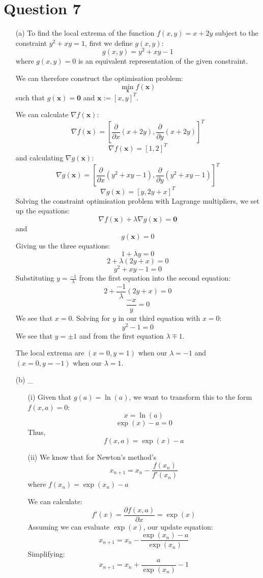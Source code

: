 \documentclass[12pt]{article}
\begin{document}
\section*{Question 7}
\begin{enumerate}
\item[(a)] To find the local extrema of the function $f(x,y) = x + 2y$ subject to the constraint $y^2 + xy = 1$, first we define $g(x, y)$:
$$g(x, y) = y^2 + xy - 1$$
where $g(x, y)=0$ is an equivalent representation of the given constraint.

We can therefore construct the optimisation problem:
$$\min_{\textbf{x}} f(\textbf{x})$$
such that $g(\textbf{x})=\textbf{0}$ and $\textbf{x} := [x, y]^T$.

We can calculate $\nabla f(\textbf{x})$:
$$\nabla f(\textbf{x}) = [\frac{\partial}{\partial x} (x+2y), \frac{\partial}{\partial y} (x+2y)]^T$$
$$\nabla f(\textbf{x}) = [1, 2]^T$$
and calculating $\nabla g(\textbf{x})$:
$$\nabla g(\textbf{x}) = [\frac{\partial}{\partial x} (y^2 + xy - 1), \frac{\partial}{\partial y} (y^2 + xy - 1)]^T$$
$$\nabla g(\textbf{x}) = [y, 2y+x]^T$$
Solving the constraint optimisation problem with Lagrange multipliers, we set up the equations:
$$\nabla f(\textbf{x})+\lambda \nabla g(\textbf{x}) = \textbf{0}$$
and
$$g(\textbf{x}) = 0$$
Giving us the three equations:
$$1+\lambda y = 0$$
$$2+\lambda (2y+x)= 0$$
$$y^2 + xy - 1 = 0$$
Substituting $ y = \frac{-1}{\lambda}$ from the first equation into the second equation:
$$2+\frac{-1}{\lambda}(2y+x) = 0$$
$$\frac{-x}{y} = 0$$
We see that $x=0$.
Solving for $y$ in our third equation with $x=0$:
$$y^2-1=0$$
We see that $y=\pm 1$ and from the first equation $\lambda\mp 1$.

The local extrema are $(x=0, y=1)$ when our $\lambda=-1$ and $(x=0, y=-1)$ when our $\lambda=1$.

\item[(b)] _
\begin{enumerate}
             \item[(i)] Given that $g(a) = \ln(a)$, we want to transform this to the form $f(x,a)=0$:
             $$x = \ln(a)$$
             $$\exp(x) - a = 0$$
             Thus,
             $$f(x, a) = \exp(x) - a$$
  \item[(ii)] We know that for Newton's method's
             $$x_{n+1} = x_{n} - \frac{f(x_n)}{f'(x_n)}$$
             where $f(x_n) = \exp(x_n) - a$

             We can calculate:
             $$f'(x) = \frac{\partial f(x, a)}{\partial x}= \exp(x)$$
             Assuming we can evaluate $\exp(x)$, our update equation:
             $$x_{n+1} = x_{n} - \frac{\exp(x_n) - a}{\exp(x_n)}$$
             Simplifying:
             $$x_{n+1} = x_{n} + \frac{a}{\exp(x_n)} - 1$$
\end{enumerate}
\end{enumerate}
\end{document}
